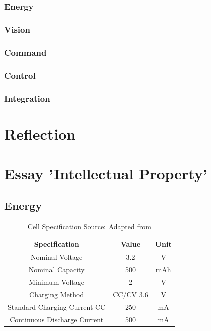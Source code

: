 \documentclass[10pt,twoside]{article}
\begin{document}
\subsubsection{Energy}

\subsubsection{Vision}

\subsubsection{Command}

\subsubsection{Control}

\subsubsection{Integration}

\section{Reflection}

\section{Essay 'Intellectual Property'}

\begin{appendices}

\section{Energy}

\setcounter{figure}{0}  %
\setcounter{table}{0}   %



\begin{table}[htb]
    \centering
    \renewcommand{\arraystretch}{1.3}
    \begin{tabular}{||c|c|c||}
    \hline
    Specification & Value & Unit \\ [0.5ex]
    \hline \hline
    Nominal Voltage    & 3.2 & V\\
    Nominal Capacity     & 500 & mAh\\
    Minimum Voltage         & 2  & V\\
    Charging Method     & CC/CV 3.6  & V\\
    Standard Charging Current CC    & 250  & mA\\
    Continuous Discharge Current   & 500  &   mA\\
    \hline
    \end{tabular}
    \caption{Cell Specification \quad Source: Adapted from \cite{AmpsplusBattery}}
    \label{fig:CellSpecification}
\end{table}
\label{appendix:Energy}

\end{appendices}



\end{document}
